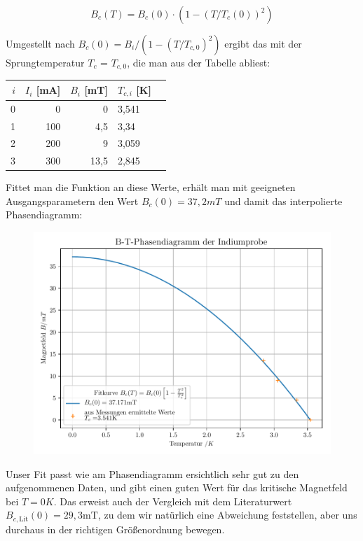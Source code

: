 \begin{equation}
B_c(T) = B_c(0) \cdot \left( 1 - \left( T / T_c(0) \right)^2 \right)
\end{equation}

Umgestellt nach $B_c(0) = B_i / (1 - (T / T_{c,0})^2 )$ ergibt das mit der Sprungtemperatur $T_c$ = $T_{c,0}$, die man aus der Tabelle abliest:

\begin{table}[h]
\center\begin{tabular}[h]{|r|r|r|l|l|}
\hline
$i$ & $I_i$ [mA] &  $B_i$ [mT] & $T_{c,i}$ [K] \\
\hline
0 &   0 &       0 & 3,541 \\
1 & 100 &  4,5 & 3,34 \\
2 & 200 &  9 & 3,059 \\
3 & 300 & 13,5 & 2,845 \\
\hline
\end{tabular}
\end{table}

Fittet man die Funktion an diese Werte, erhält man mit geeigneten Ausgangsparametern den Wert $B_c(0) = 37,2 mT$ und damit das interpolierte Phasendiagramm:

\begin{figure}[h]
\includegraphics[width=\textwidth]{B-T-Phasendiagramm_der_Indiumprobe.pdf}
\end{figure}

Unser Fit passt wie am Phasendiagramm ersichtlich sehr gut zu den aufgenommenen Daten, und gibt einen guten Wert für das kritische Magnetfeld bei $T=0K$.
Das erweist auch der Vergleich mit dem Literaturwert $ B_{c,\textrm{Lit}}(0) = 29,3\textrm{mT}$, zu dem wir natürlich eine Abweichung feststellen, aber uns durchaus in der richtigen Größenordnung bewegen. 

